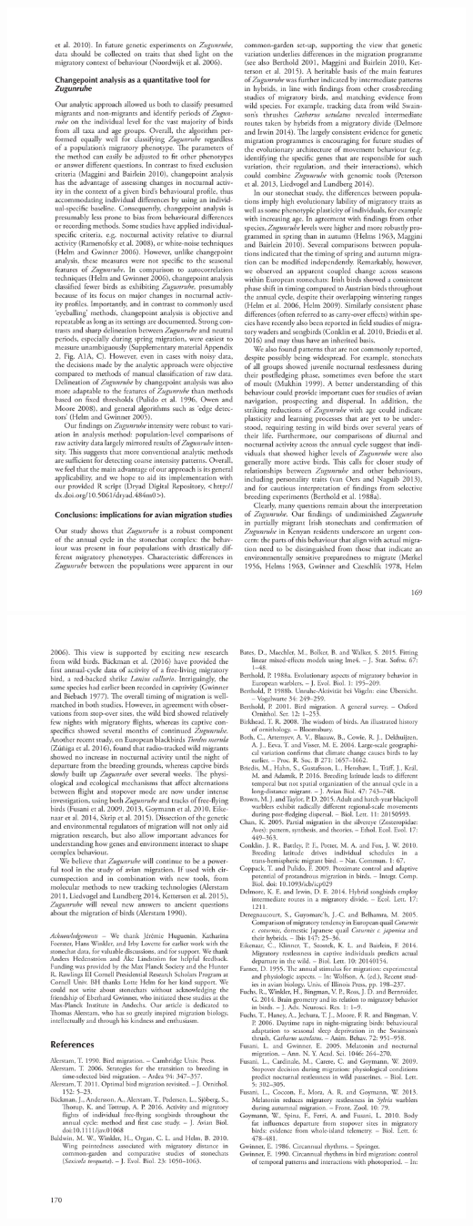 \documentclass[a4paper, twoside]{templates/ociamthesis}
\begin{document}
\includegraphics[width=1\linewidth]{pdf_chapters/zug/zug_crop_Part15}
\includegraphics[width=1\linewidth]{pdf_chapters/zug/zug_crop_Part16}
\end{document}
